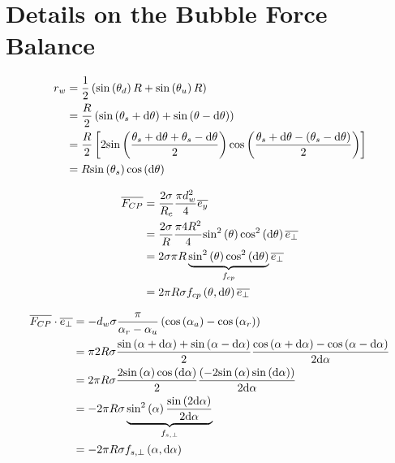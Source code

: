 
\chapter{Details on the Bubble Force Balance}


\lipsum[13-14]


\begin{align}
r_{w} &= \frac{1}{2}\parth{\sin{\theta_{d}}R + \sin{\theta_{u}}R}\\
&= \frac{R}{2}\parth{ \sin{\theta_{s}+\dtheta} + \sin{\theta-\dtheta} }\\
&= \frac{R}{2}\crocht{2\sin{ \frac{\theta_{s}+\dtheta + \theta_{s}-\dtheta}{2} }\cos{ \frac{\theta_{s}+\dtheta - \parth{\theta_{s}-\dtheta}}{2}  }   } \\
&= R\sin{\theta_{s}}\cos{\dtheta}
\end{align}


\begin{align}
\vect{F_{CP}}&=\frac{2\sigma}{R_{c}}\frac{\pi d_{w}^{2}}{4}\vect{e_{y}}\\
&= \frac{2\sigma}{R}\frac{\pi 4R^{2}}{4}\sinsq{\theta}\cossq{\dtheta}\vect{e_{\bot}}\\
&=2\sigma \pi R \underbrace{\sinsq{\theta} \cossq{\dtheta}}_{f_{cp}}\vect{e_{\bot}}\\
&=2\pi R \sigma f_{cp}\parth{\theta, \dtheta}\vect{e_{\bot}}
\end{align}



\begin{align}
\vect{F_{CP}}\cdot \vect{e_{\bot}}&=-d_{w} \sigma \frac{\pi}{\alpha_{r}-\alpha_{u}}\parth{\cos{\alpha_{a}}- \cos{\alpha_{r}}}\\
&=\pi 2 R \sigma \frac{\sin{\alpha+\dalpha} + \sin{\alpha-\dalpha}}{2} \frac{\cos{\alpha+\dalpha} - \cos{\alpha-\dalpha}}{2\dalpha}   \\
&=2\pi R \sigma \frac{2\sin{\alpha}\cos{\dalpha}}{2}\frac{\parth{-2\sin{\alpha}\sin{\dalpha}}}{2\dalpha}\\
&=-2\pi R \sigma \underbrace{ \sinsq{\alpha}\frac{\sin{2\dalpha}}{2\dalpha} }_{f_{s,\bot}}\\
&=-2\pi R \sigma f_{s,\bot}\parth{\alpha,\dalpha}\\
\end{align}



